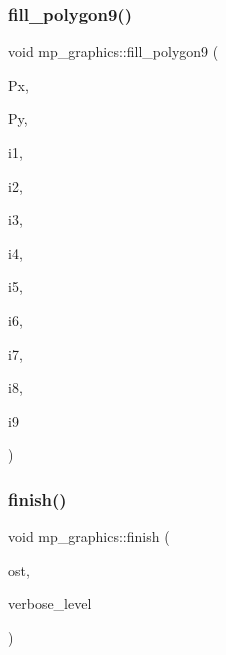 \subsubsection{\texorpdfstring{fill\+\_\+polygon9()}{fill\_polygon9()}}
{\footnotesize\ttfamily void mp\+\_\+graphics\+::fill\+\_\+polygon9 (\begin{DoxyParamCaption}\item[{\mbox{\hyperlink{galois_8h_a09fddde158a3a20bd2dcadb609de11dc}{I\+NT}} $\ast$}]{Px,  }\item[{\mbox{\hyperlink{galois_8h_a09fddde158a3a20bd2dcadb609de11dc}{I\+NT}} $\ast$}]{Py,  }\item[{\mbox{\hyperlink{galois_8h_a09fddde158a3a20bd2dcadb609de11dc}{I\+NT}}}]{i1,  }\item[{\mbox{\hyperlink{galois_8h_a09fddde158a3a20bd2dcadb609de11dc}{I\+NT}}}]{i2,  }\item[{\mbox{\hyperlink{galois_8h_a09fddde158a3a20bd2dcadb609de11dc}{I\+NT}}}]{i3,  }\item[{\mbox{\hyperlink{galois_8h_a09fddde158a3a20bd2dcadb609de11dc}{I\+NT}}}]{i4,  }\item[{\mbox{\hyperlink{galois_8h_a09fddde158a3a20bd2dcadb609de11dc}{I\+NT}}}]{i5,  }\item[{\mbox{\hyperlink{galois_8h_a09fddde158a3a20bd2dcadb609de11dc}{I\+NT}}}]{i6,  }\item[{\mbox{\hyperlink{galois_8h_a09fddde158a3a20bd2dcadb609de11dc}{I\+NT}}}]{i7,  }\item[{\mbox{\hyperlink{galois_8h_a09fddde158a3a20bd2dcadb609de11dc}{I\+NT}}}]{i8,  }\item[{\mbox{\hyperlink{galois_8h_a09fddde158a3a20bd2dcadb609de11dc}{I\+NT}}}]{i9 }\end{DoxyParamCaption})}

\mbox{\label{classmp__graphics_af143e19052d1e5f8c00753c44860dea1}} 
\subsubsection{\texorpdfstring{finish()}{finish()}}
{\footnotesize\ttfamily void mp\+\_\+graphics\+::finish (\begin{DoxyParamCaption}\item[{ostream \&}]{ost,  }\item[{\mbox{\hyperlink{galois_8h_a09fddde158a3a20bd2dcadb609de11dc}{I\+NT}}}]{verbose\+\_\+level }\end{DoxyParamCaption})}

